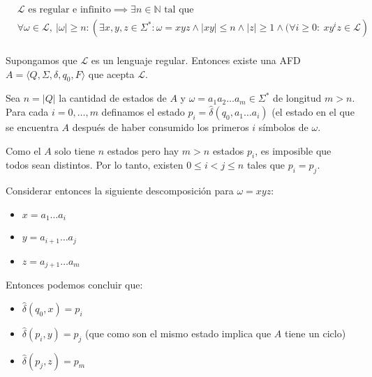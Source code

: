 \begin{align*}
   & \mathcal{L} \text{ es regular e infinito}\implies \exists n\in\mathbb{N}\text{ tal que } \\ &\forall\omega\in\mathcal{L},~|\omega|\geq n:\left( \exists x,y,z\in\Sigma^*: \omega=xyz\land|xy|\leq n\land|z|\geq 1 \land (\forall i\geq  0 :~ xy^iz\in\mathcal{L}\right) \\
\end{align*}
\begin{demo}[0.8\textwidth]  Supongamos que \(\mathcal{L}\) es un lenguaje regular. Entonces existe una AFD \(A =\langle Q, \Sigma, \delta, q_0, F\rangle\) que acepta \(\mathcal{L}\).

  Sea \(n = |Q|\) la cantidad de estados de \(A\) y \(\omega=a_1a_2\dots a_m\in\Sigma^*\) de longitud \(m > n\). Para cada \(i = 0,\dots, m\) definamos el estado \(p_i = \hat\delta(q_0, a_1\dots a_i)\) (el estado en el que se encuentra \(A\) después de haber consumido los primeros \(i\) símbolos de \(\omega\).

  Como el \(A\) solo tiene \(n\) estados pero hay \(m > n\) estados \(p_i\), es imposible que todos sean distintos. Por lo tanto, existen \(0 \leq i < j \leq n\) tales que \(p_i = p_j\).

  Considerar entonces la siguiente descomposición para \(\omega = xyz\):
  \begin{itemize}
    \item[] \(x = a_1\dots a_i\)
    \item[] \(y = a_{i+1}\dots a_j\)
    \item[] \(z = a_{j+1}\dots a_m\)
  \end{itemize}
  Entonces podemos concluir que:
  \begin{itemize}
    \item[] \(\hat\delta(q_0, x) = p_i\)
    \item[] \(\hat\delta(p_i, y) = p_j\) (que como son el mismo estado implica que \(A\) tiene un ciclo)
    \item[] \(\hat\delta(p_j, z) = p_m\)
  \end{itemize}

\end{demo}
